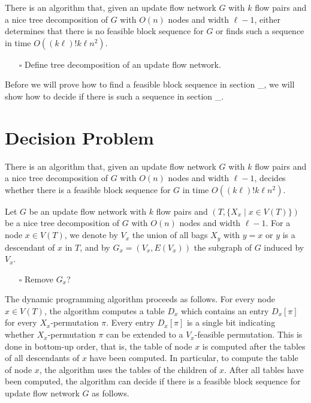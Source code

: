 \documentclass[fontsize=11pt,paper=a4]{book}
\begin{document}
\begin{thm}
There is an algorithm that, given an update flow network \(G\) with \(k\) flow pairs and a nice tree decomposition of \(G\) with \(O(n)\) nodes and width \(\ell-1\), either determines that there is no feasible block sequence for \(G\) or finds such a sequence in time \(O((k\ell)!k\ell n^2)\).
\label{orge6b5d5e}
\end{thm}

\begin{itemize}
\item[{$\square$}] Define tree decomposition of an update flow network.
\end{itemize}


Before we will prove how to find a feasible block sequence in section \_, we will show how to decide if there is such a sequence in section \_.

\chapter{Decision Problem}
\label{sec:org1a64ab1}

\begin{thm}
There is an algorithm that, given an update flow network \(G\) with \(k\) flow pairs and a nice tree decomposition of \(G\) with \(O(n)\) nodes and width \(\ell-1\), decides whether there is a feasible block sequence for \(G\) in time \(O((k\ell)!k\ell n^2)\).
\label{org24f621a}
\end{thm}

Let \(G\) be an update flow network with \(k\) flow pairs and \((T,\{X_x\mid x\in V(T)\})\) be a nice tree decomposition of \(G\) with \(O(n)\) nodes and width \(\ell-1\).
For a node \(x\in V(T)\), we denote by \(V_x\) the union of all bags \(X_y\) with \(y=x\) or \(y\) is a descendant of \(x\) in \(T\), and by \(G_x=(V_x,E(V_x))\) the subgraph of \(G\) induced by \(V_x\).

\begin{itemize}
\item[{$\square$}] Remove \(G_x\)?
\end{itemize}


The dynamic programming algorithm proceeds as follows.
For every node \(x\in V(T)\), the algorithm computes a table \(D_x\) which contains an entry \(D_x[\pi]\) for every \(X_x\)-permutation \(\pi\).
Every entry \(D_x[\pi]\) is a single bit indicating whether \(X_x\)-permutation \(\pi\) can be extended to a \(V_x\)-feasible permutation.
This is done in bottom-up order, that is, the table of node \(x\) is computed after the tables of all descendants of \(x\) have been computed.
In particular, to compute the table of node \(x\), the algorithm uses the tables of the children of \(x\).
After all tables have been computed, the algorithm can decide if there is a feasible block sequence for update flow network \(G\) as follows.
\end{document}
